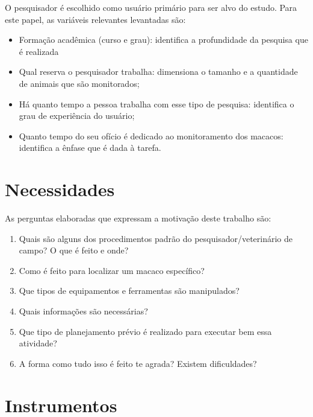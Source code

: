 O pesquisador é escolhido como usuário primário para ser alvo do estudo. Para este papel, as variáveis relevantes levantadas são:

\begin{itemize}
\item Formação acadêmica (curso e grau): identifica a profundidade da pesquisa que é realizada
\item Qual reserva o pesquisador trabalha: dimensiona o tamanho e a quantidade de animais que são monitorados;
\item Há quanto tempo a pessoa trabalha com esse tipo de pesquisa: identifica o grau de experiência do usuário;
\item Quanto tempo do seu ofício é dedicado ao monitoramento dos macacos: identifica a ênfase que é dada à tarefa.
\end{itemize}

\section{Necessidades}

As perguntas elaboradas que expressam a motivação deste trabalho são:

\begin{enumerate}
\item Quais são alguns dos procedimentos padrão do pesquisador/veterinário de campo? O que é feito e onde?
\item Como é feito para localizar um macaco específico?
\item Que tipos de equipamentos e ferramentas são manipulados?
\item Quais informações são necessárias?
\item Que tipo de planejamento prévio é realizado para executar bem essa atividade?
\item A forma como tudo isso é feito te agrada? Existem dificuldades?
\end{enumerate}

\section{Instrumentos}

